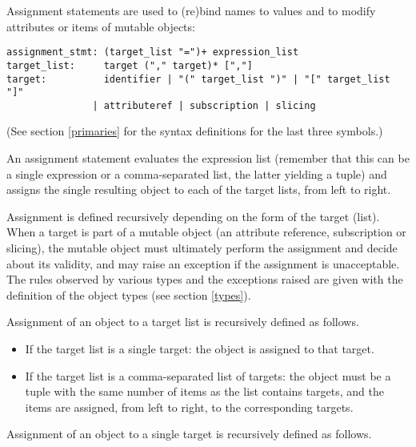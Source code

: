 Assignment statements are used to (re)bind names to values and to
modify attributes or items of mutable objects:

\begin{verbatim}
assignment_stmt: (target_list "=")+ expression_list
target_list:     target ("," target)* [","]
target:          identifier | "(" target_list ")" | "[" target_list "]"
               | attributeref | subscription | slicing
\end{verbatim}

(See section \ref{primaries} for the syntax definitions for the last
three symbols.)

An assignment statement evaluates the expression list (remember that
this can be a single expression or a comma-separated list, the latter
yielding a tuple) and assigns the single resulting object to each of
the target lists, from left to right.

Assignment is defined recursively depending on the form of the target
(list).  When a target is part of a mutable object (an attribute
reference, subscription or slicing), the mutable object must
ultimately perform the assignment and decide about its validity, and
may raise an exception if the assignment is unacceptable.  The rules
observed by various types and the exceptions raised are given with the
definition of the object types (see section \ref{types}).

Assignment of an object to a target list is recursively defined as
follows.

\begin{itemize}
\item
If the target list is a single target: the object is assigned to that
target.

\item
If the target list is a comma-separated list of targets: the object
must be a tuple with the same number of items as the list contains
targets, and the items are assigned, from left to right, to the
corresponding targets.

\end{itemize}

Assignment of an object to a single target is recursively defined as
follows.

